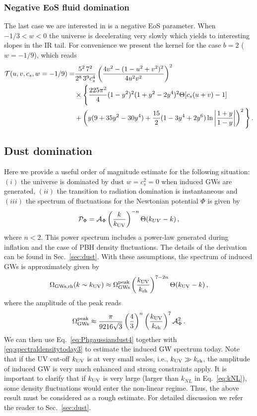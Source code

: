 \documentclass[a4paper,11pt]{article}
\numberwithin{equation}{section}
\begin{document}
\subsubsection{Negative EoS fluid domination}

The last case we are interested in is a negative EoS parameter. When $-1/3<w<0$ the universe is decelerating very slowly which yields to interesting slopes in the IR tail. For convenience we present the kernel for the case $b=2$ ($w=-1/9$), which reads
\begin{align}\label{eq:wm19}
{\cal T}(u,v,c_s,w=-1/9)=&\frac{5^2\,7^2}{2^8\,3^9 c_s^4 }\left(\frac{4v^2-(1-u^2+v^2)^2}{4u^2v^2}\right)^2\nonumber\\&\times
\Bigg\{\frac{225\pi^2}{4}(1-y^2)^2(1+y^2-2y^4)^2\Theta[c_s(u+v)-1]
\nonumber\\&+\left(y(9+35y^2-30y^4)+\frac{15}{2}(1-3y^4+2y^6) \ln\left|\frac{1+y}{1-y}\right|\right)^2\Bigg\}\,.
\end{align}


\subsection{Dust domination\label{sec:dustestimate}}

Here we provide a useful order of magnitude estimate for the following situation: $(i)$ the universe is dominated by dust $w=c_s^2=0$ when induced GWs are generated, $(ii)$ the transition to radiation domination is instantaneous and $(iii)$ the spectrum of fluctuations for the Newtonian potential $\Phi$ is given by 
\begin{align}\label{eq:pphidustfinal}
{\cal P}_{\Phi}={\cal A}_\Phi\left(\frac{k}{k_{\rm UV}}\right)^{-n}\Theta(k_{UV}-k)\,,
\end{align}
where $n<2$. This power spectrum includes a power-law generated during inflation and the case of PBH density fluctuations. The details of the derivation can be found in Sec.~\ref{sec:dust}. With these assumptions, the spectrum of induced GWs is approximately given by
\begin{align}\label{eq:Phgaussiandust4final}
\Omega_{\rm GWs,rh}(k\sim k_{\rm UV})\approx\Omega^{\rm peak}_{\rm GWs}\left(\frac{k_{\rm UV}}{k_{\rm rh}}\right)^{7-2n}\Theta(k_{\rm UV}-k)\,,
\end{align}
where the amplitude of the peak reads
\begin{align}\label{eq:Phgaussiandust3final}
\Omega^{\rm peak}_{\rm GWs}\approx\frac{\pi}{9216 \sqrt{3}}\left(\frac{4}{3}\right)^{n}\left(\frac{k_{\rm UV}}{k_{\rm rh}}\right)^7{\cal A}^2_{\Phi}\,.
\end{align}
We can then use Eq.~\eqref{eq:Phgaussiandust4} together with \eqref{eq:spectraldensitytoday3} to estimate the induced GW spectrum today. Note that if the UV cut-off $k_{\rm UV}$ is at very small scales, i.e., $k_{\rm UV}\gg k_{\rm rh}$, the amplitude of induced GW is very much enhanced and strong constraints apply. It is important to clarify that if $k_{\rm UV}$ is very large (larger than $k_{NL}$ in Eq.~\eqref{eq:kNL}), some density fluctuations would enter the non-linear regime. Thus, the above result must be considered as a rough estimate. For detailed discussion we refer the reader to Sec.~\ref{sec:dust}.
\end{document}
